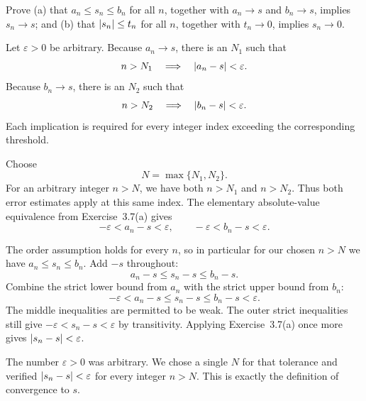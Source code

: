 

\goal Prove (a) that $a_n\le s_n\le b_n$ for all $n$, together with
$a_n\to s$ and $b_n\to s$, implies $s_n\to s$; and (b) that
$\left|s_n\right|\le t_n$ for all $n$, together with $t_n\to0$, implies
$s_n\to0$.

Let $\varepsilon>0$ be arbitrary. Because $a_n\to s$, there is an
$N_1$ such that
\[
 n>N_1\quad\Longrightarrow\quad\left|a_n-s\right|<\varepsilon.
\]
Because $b_n\to s$, there is an $N_2$ such that
\[
 n>N_2\quad\Longrightarrow\quad\left|b_n-s\right|<\varepsilon.
\]
Each implication is required for every integer index exceeding the
corresponding threshold.

Choose
\[
 N=\max\{N_1,N_2\}.
\]
For an arbitrary integer $n>N$, we have both $n>N_1$ and $n>N_2$.
Thus both error estimates apply at this same index. The elementary
absolute-value equivalence from Exercise~3.7(a) gives
\[
 -\varepsilon<a_n-s<\varepsilon,
 \qquad
 -\varepsilon<b_n-s<\varepsilon.
\]

The order assumption holds for every $n$, so in particular for our
chosen $n>N$ we have $a_n\le s_n\le b_n$. Add $-s$ throughout:
\[
 a_n-s\le s_n-s\le b_n-s.
\]
Combine the strict lower bound from $a_n$ with the strict upper bound
from $b_n$:
\[
 -\varepsilon<a_n-s\le s_n-s\le b_n-s<\varepsilon.
\]
The middle inequalities are permitted to be weak. The outer strict
inequalities still give
$-\varepsilon<s_n-s<\varepsilon$ by transitivity. Applying
Exercise~3.7(a) once more gives $\left|s_n-s\right|<\varepsilon$.

The number $\varepsilon>0$ was arbitrary. We chose a single $N$ for
that tolerance and verified $\left|s_n-s\right|<\varepsilon$ for every
integer $n>N$. This is exactly the definition of convergence to $s$.



